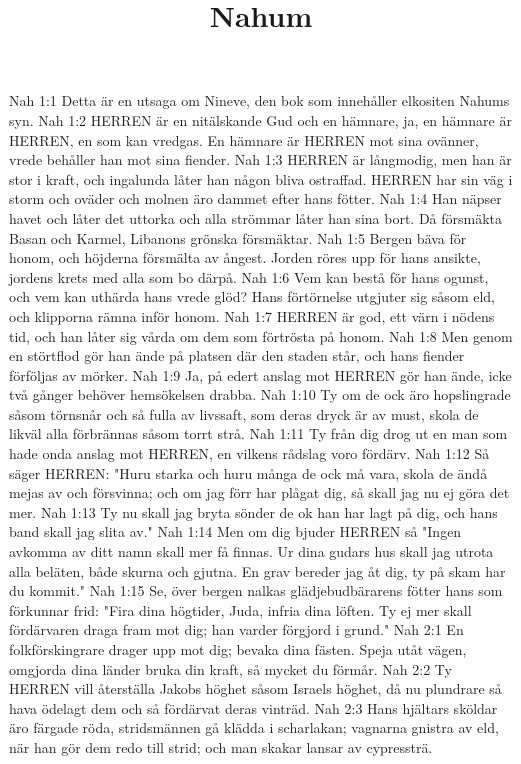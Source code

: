 

\title{Nahum}

Nah 1:1  Detta är en utsaga om Nineve, den bok som innehåller elkositen Nahums syn.
Nah 1:2  HERREN är en nitälskande Gud och en hämnare, ja, en hämnare är HERREN, en som kan vredgas. En hämnare är HERREN mot sina ovänner, vrede behåller han mot sina fiender.
Nah 1:3  HERREN är långmodig, men han är stor i kraft, och ingalunda låter han någon bliva ostraffad. HERREN har sin väg i storm och oväder och molnen äro dammet efter hans fötter.
Nah 1:4  Han näpser havet och låter det uttorka och alla strömmar låter han sina bort. Då försmäkta Basan och Karmel, Libanons grönska försmäktar.
Nah 1:5  Bergen bäva för honom, och höjderna försmälta av ångest. Jorden röres upp för hans ansikte, jordens krets med alla som bo därpå.
Nah 1:6  Vem kan bestå för hans ogunst, och vem kan uthärda hans vrede glöd? Hans förtörnelse utgjuter sig såsom eld, och klipporna rämna inför honom.
Nah 1:7  HERREN är god, ett värn i nödens tid, och han låter sig vårda om dem som förtrösta på honom.
Nah 1:8  Men genom en störtflod gör han ände på platsen där den staden står, och hans fiender förföljas av mörker.
Nah 1:9  Ja, på edert anslag mot HERREN gör han ände, icke två gånger behöver hemsökelsen drabba.
Nah 1:10  Ty om de ock äro hopslingrade såsom törnsnår och så fulla av livssaft, som deras dryck är av must, skola de likväl alla förbrännas såsom torrt strå.
Nah 1:11  Ty från dig drog ut en man som hade onda anslag mot HERREN, en vilkens rådslag voro fördärv.
Nah 1:12  Så säger HERREN: "Huru starka och huru många de ock må vara, skola de ändå mejas av och försvinna; och om jag förr har plågat dig, så skall jag nu ej göra det mer.
Nah 1:13  Ty nu skall jag bryta sönder de ok han har lagt på dig, och hans band skall jag slita av."
Nah 1:14  Men om dig bjuder HERREN så "Ingen avkomma av ditt namn skall mer få finnas. Ur dina gudars hus skall jag utrota alla beläten, både skurna och gjutna. En grav bereder jag åt dig, ty på skam har du kommit."
Nah 1:15  Se, över bergen nalkas glädjebudbärarens fötter hans som förkunnar frid: "Fira dina högtider, Juda, infria dina löften. Ty ej mer skall fördärvaren draga fram mot dig; han varder förgjord i grund."
Nah 2:1  En folkförskingrare drager upp mot dig; bevaka dina fästen. Speja utåt vägen, omgjorda dina länder bruka din kraft, så mycket du förmår.
Nah 2:2  Ty HERREN vill återställa Jakobs höghet såsom Israels höghet, då nu plundrare så hava ödelagt dem och så fördärvat deras vinträd.
Nah 2:3  Hans hjältars sköldar äro färgade röda, stridsmännen gå klädda i scharlakan; vagnarna gnistra av eld, när han gör dem redo till strid; och man skakar lansar av cypressträ.
